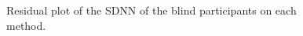 \begin{figure}[!htb]
\begin{minipage}{0.45\textwidth}
        \caption{Residual plot of the SDNN of the blind participants on each method.}
        \label{fig:residplot_sdnn_two_way_blind}
    \end{minipage}
\end{figure}



\FloatBarrier